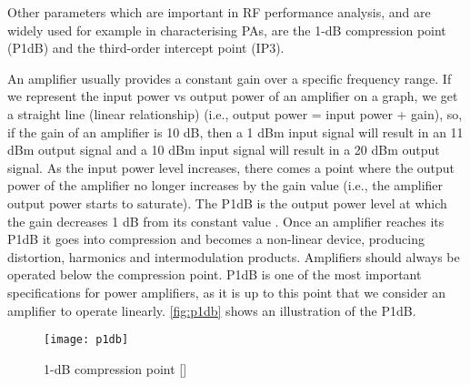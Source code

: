 Other parameters which are important in RF performance analysis, and are widely used for example in characterising PAs, are the 1-dB compression point (P1dB) and the third-order intercept point (IP3).

An amplifier usually provides a constant gain over a specific frequency range. If we represent the input power vs output power of an amplifier on a graph, we get a straight line (linear relationship) (i.e., output power = input power + gain), so, if the gain of an amplifier is 10 dB, then a 1 dBm input signal will result in an 11 dBm output signal and a 10 dBm input signal will result in a 20 dBm output signal. As the input power level increases, there comes a point where the output power of the amplifier no longer increases by the gain value (i.e., the amplifier output power starts to saturate). The P1dB is the output power level at which the gain decreases 1 dB from its constant value \cite{p1db}. Once an amplifier reaches its P1dB it goes into compression and becomes a non-linear device, producing distortion, harmonics and intermodulation products. Amplifiers should always be operated below the compression point. P1dB is one of the most important specifications for power amplifiers, as it is up to this point that we consider an amplifier to operate linearly. \autoref{fig:p1db} shows an illustration of the P1dB.

\begin{figure}[ht]
  \centering
  \texttt{[image: p1db]}
  \caption{1-dB compression point [\citeauthor{p1db}]}
  \label{fig:p1db}
\end{figure}

